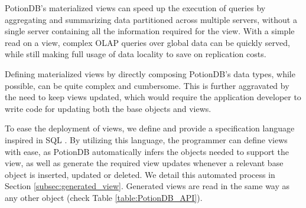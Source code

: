 \documentclass{vldb}
\begin{document}
PotionDB's materialized views can speed up the execution of queries by aggregating and  summarizing data partitioned across multiple servers, without a single server containing all the information required for the view.
With a simple read on a view, complex OLAP queries over global data can be quickly served, while still making full usage of data locality to save on replication costs.

Defining materialized views by directly composing PotionDB's data types, while possible, can be quite complex and cumbersome.
This is further aggravated by the need to keep views updated, which would require the application developer to write code for updating both the base objects and views.

To ease the deployment of views, we define and provide a specification language inspired in SQL \cite{sequel}.
By utilizing this language, the programmer can define views with ease, as PotionDB automatically infers the objects needed to support the view, as well as generate the required view updates whenever a relevant base object is inserted, updated or deleted. 
We detail this automated process in Section \ref{subsec:generated_view}.
Generated views are read in the same way as any other object (check Table \ref{table:PotionDB_API}).
\end{document}

